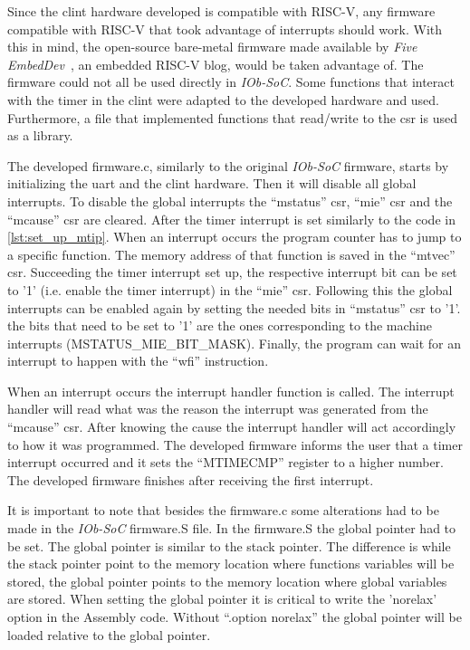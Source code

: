 Since the \acrshort{clint} hardware developed is compatible with RISC-V, any firmware compatible with RISC-V that took advantage of interrupts should work. With this in mind, the open-source bare-metal firmware made available by \textit{Five EmbedDev}~\cite{bare_metal_int}, an embedded RISC-V blog, would be taken advantage of. The firmware could not all be used directly in \textit{IOb-SoC}. Some functions that interact with the timer in the \acrshort{clint} were adapted to the developed hardware and used. Furthermore, a file that implemented functions that read/write to the \acrlong{csr} is used as a library.

The developed firmware.c, similarly to the original \textit{IOb-SoC} firmware, starts by initializing the \acrshort{uart} and the \acrshort{clint} hardware. Then it will disable all global interrupts. To disable the global interrupts the \enquote{mstatus} \acrshort{csr}, \enquote{mie} \acrshort{csr} and the \enquote{mcause} \acrshort{csr} are cleared. After the timer interrupt is set similarly to the code in \ref{lst:set_up_mtip}. When an interrupt occurs the program counter has to jump to a specific function. The memory address of that function is saved in the \enquote{mtvec} \acrshort{csr}. Succeeding the timer interrupt set up, the respective interrupt bit can be set to '1' (i.e. enable the timer interrupt) in the \enquote{mie} \acrshort{csr}. Following this the global interrupts can be enabled again by setting the needed bits in \enquote{mstatus} \acrshort{csr} to '1'. the bits that need to be set to '1' are the ones corresponding to the machine interrupts (MSTATUS\_MIE\_BIT\_MASK). Finally, the program can wait for an interrupt to happen with the \enquote{wfi} instruction.

When an interrupt occurs the interrupt handler function is called. The interrupt handler will read what was the reason the interrupt was generated from the \enquote{mcause} \acrshort{csr}. After knowing the cause the interrupt handler will act accordingly to how it was programmed. The developed firmware informs the user that a timer interrupt occurred and it sets the \enquote{MTIMECMP} register to a higher number. The developed firmware finishes after receiving the first interrupt.

It is important to note that besides the firmware.c some alterations had to be made in the \textit{IOb-SoC} firmware.S file. In the firmware.S the global pointer had to be set. The global pointer is similar to the stack pointer. The difference is while the stack pointer point to the memory location where functions variables will be stored, the global pointer points to the memory location where global variables are stored. When setting the global pointer it is critical to write the 'norelax' option in the Assembly code. Without \enquote{.option norelax} the global pointer will be loaded relative to the global pointer.

